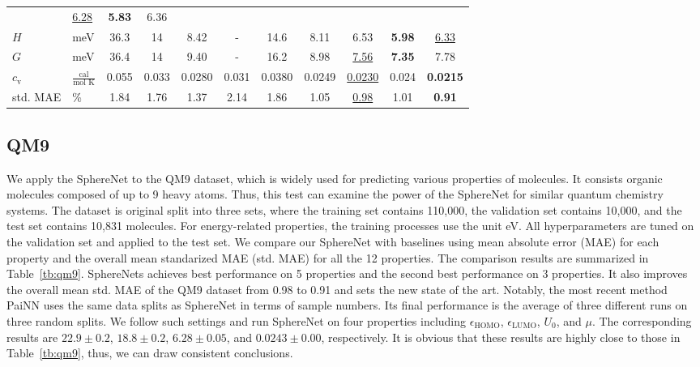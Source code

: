 \documentclass{article}
\begin{document}
\begin{table*}[t]
{\begin{tabular}{llccccccccc}
&  \underline{6.28} & \textbf{5.83}& 6.36\\
$H$                          &                         meV &   36.3 &              14 &    8.42 &               - & 14.6  &  8.11
&  6.53 & \textbf{5.98}& \underline{6.33}\\
$G$                          &                          meV &   36.4 &              14 &    9.40 &                 - &  16.2  & 8.98 
&  \underline{7.56} & \textbf{7.35}&  7.78\\
$c_\text{v}$ \vspace{1pt}    &  $\frac{\mbox{cal}}{\mbox{mol K}}$ &  0.055 &           0.033 &  0.0280 &    0.031 & 0.0380 & 0.0249 
&  \underline{0.0230} & 0.024&  \textbf{0.0215}\\
\hline 
std. MAE &                                    \% &   1.84 &            1.76 &    1.37 &     2.14 & 1.86   & 1.05 &  \underline{0.98} & 1.01& \textbf{0.91}\\
\bottomrule
\end{tabular}}
\end{table*}









\subsection{QM9}
We apply the SphereNet to the QM9 dataset,
which is widely used
for predicting various properties of molecules. 
It consists organic molecules composed of up to 9 heavy atoms. Thus, this test can examine
the power of the SphereNet for similar quantum chemistry systems.
The dataset is original split into three sets, where the training set
contains 110,000, the validation set contains 10,000, and the test set contains 10,831 molecules.
For energy-related properties, the training processes
use the unit eV.
All hyperparameters are tuned on the validation set
and applied to the test set.
We compare our SphereNet with baselines 
using mean absolute error (MAE) for each property and 
the overall mean standarized MAE (std. MAE) for all the 12 properties.
The comparison results are 
summarized in Table~\ref{tb:qm9}.
SphereNets achieves best
performance on 5 properties and the second best performance
on 3 properties.
It also improves the overall mean std. MAE
of the QM9 dataset from 0.98 to 0.91 and sets the new state of the art.
\textcolor{COLOR}{Notably, the most recent method PaiNN uses the same data splits as SphereNet in terms of sample numbers.
Its final performance is the average of three different runs
on three random splits.
We follow such settings and run SphereNet on four properties including
$\epsilon_\text{HOMO}$, $\epsilon_\text{LUMO}$, $U_0$, and $\mu$.
The corresponding results are $22.9\pm0.2$, $18.8\pm0.2$, $6.28\pm0.05$, and $0.0243\pm0.00$, respectively.
It is obvious that these results are highly close to those in Table~\ref{tb:qm9}, thus, we can draw consistent conclusions.}
\end{document}
